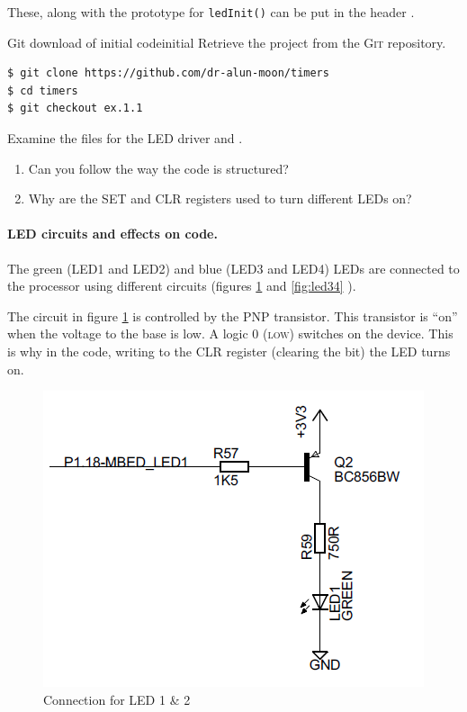 \documentclass[a4paper]{tufte-handout}
\begin{document}
These, along with the prototype for \verb'ledInit()' can be put in the
header .
  \begin{exercise}{Git download of initial code}{initial}
    Retrieve the project from the \textsc{Git} repository.
\begin{verbatim}
$ git clone https://github.com/dr-alun-moon/timers
$ cd timers
$ git checkout ex.1.1
\end{verbatim}
    Examine the files for the LED driver  and
    .
    \begin{enumerate}
    \item Can you follow the way the code is structured?
    \item Why are the SET and CLR registers used to turn different
      LEDs on?
    \end{enumerate}
  \end{exercise}

\paragraph{LED circuits and effects on code.}
The green (LED1 and LED2) and blue (LED3 and LED4) LEDs are connected
to the processor using different circuits (figures \ref{fig:led12} and
\ref{fig:led34} \citep{quickstart}).

  The
circuit in figure \ref{fig:led12} is controlled by the PNP transistor.
This transistor is ``on'' when the voltage to the base is low.  A
logic 0 (\textsc{low}) switches on the device.  This is why in the
code, writing to the \textsc{CLR} register (clearing the bit) the LED
turns on.
\begin{figure}
  \includegraphics{led12}
  \caption{Connection for LED 1 \& 2}
  \label{fig:led12}
\end{figure}
\end{document}
